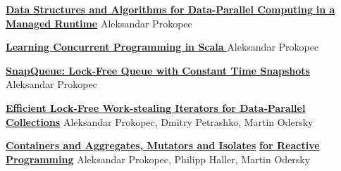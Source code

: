 \documentclass[9pt]{article}
\begin{document}

\medskip

\noindent\href{http://infoscience.epfl.ch/record/200977/files/EPFL_TH6264.pdf}
{\bf Data Structures and Algorithms for Data-Parallel Computing }
\newline
\noindent\href{http://infoscience.epfl.ch/record/200977/files/EPFL_TH6264.pdf}
{\bf in a Managed Runtime}
\newline
\noindent Aleksandar Prokopec
\bigskip


\medskip

\noindent\href{http://www.amazon.com/Learning-Concurrent-Programming-Aleksandar-Prokopec/dp/1783281413/}
{\bf Learning Concurrent Programming in Scala }
\newline
\noindent Aleksandar Prokopec
\bigskip




\noindent\href{http://axel22.github.io/resources/docs/snapqueue.pdf}
{\bf SnapQueue: Lock-Free Queue with Constant Time Snapshots}
\newline
\noindent Aleksandar Prokopec
\newline
{}
\bigskip

\noindent\href{http://axel22.github.io/resources/docs/pdp.pdf}
{\bf Efficient Lock-Free Work-stealing Iterators for Data-Parallel Collections}
\newline
\noindent Aleksandar Prokopec, Dmitry Petrashko, Martin Odersky
\newline
{}
\bigskip

\noindent\href{http://axel22.github.io/resources/docs/reactives-and-isolates.pdf}
{\bf Containers and Aggregates, Mutators and Isolates}
\newline
\noindent\href{http://axel22.github.io/resources/docs/reactives-and-isolates.pdf}
{\bf for Reactive Programming}
\newline
\noindent Aleksandar Prokopec, Philipp Haller, Martin Odersky
\newline
{}
\bigskip
\end{document}
